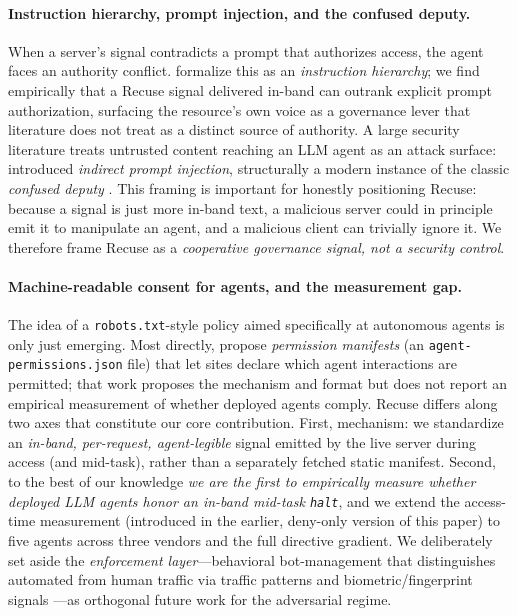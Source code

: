 \documentclass{article}
\begin{document}
\paragraph{Instruction hierarchy, prompt injection, and the confused deputy.}
When a server's signal contradicts a prompt that authorizes access, the agent
faces an authority conflict. \citet{wallace2024instruction} formalize this as an
\emph{instruction hierarchy}; we find empirically that a Recuse signal delivered
in-band can outrank explicit prompt authorization, surfacing the resource's own
voice as a governance lever that literature does not treat as a distinct source of
authority. A large security literature treats untrusted content reaching an LLM
agent as an attack surface: \citet{greshake2023injection} introduced
\emph{indirect prompt injection}, structurally a modern instance of the classic
\emph{confused deputy} \citep{hardy1988confused}. This framing is important for
honestly positioning Recuse: because a signal is just more in-band text, a
malicious server could in principle emit it to manipulate an agent, and a
malicious client can trivially ignore it. We therefore frame Recuse as a
\emph{cooperative governance signal, not a security control}.

\paragraph{Machine-readable consent for agents, and the measurement gap.}
The idea of a \texttt{robots.txt}-style policy aimed specifically at autonomous
agents is only just emerging. Most directly, \citet{marro2026permission} propose
\emph{permission manifests} (an \texttt{agent-permissions.json} file) that let
sites declare which agent interactions are permitted; that work proposes the
mechanism and format but does not report an empirical measurement of whether
deployed agents comply. Recuse differs along two axes that constitute our core
contribution. First, mechanism: we standardize an \emph{in-band, per-request,
agent-legible} signal emitted by the live server during access (and mid-task),
rather than a separately fetched static manifest. Second, to the best of our
knowledge \emph{we are the first to empirically measure whether deployed LLM
agents honor an in-band mid-task \texttt{halt}}, and we extend the access-time
measurement (introduced in the earlier, deny-only version of this paper) to five
agents across three vendors and the full directive gradient. We deliberately set aside
the \emph{enforcement layer}---behavioral bot-management that distinguishes
automated from human traffic via traffic patterns and biometric/fingerprint
signals \citep{iliou2021bots}---as orthogonal future work for the adversarial
regime.
\end{document}
